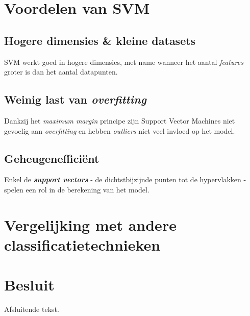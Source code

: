 \documentclass[kulak]{kulakposter}
\begin{document}
\begin{multicols}{2}
\section{Voordelen van SVM}

\subsection{Hogere dimensies \& kleine datasets}

SVM werkt goed in hogere dimensies, met name wanneer het aantal \textit{features} groter is dan het aantal datapunten.

\subsection{Weinig last van \textit{overfitting}}

Dankzij het \textit{maximum margin} principe zijn Support Vector Machines niet gevoelig aan \textit{overfitting} en hebben \textit{outliers} niet veel invloed op het model.

\subsection{Geheugenefficiënt}

Enkel de \textbf{\textit{support vectors}} - de dichtstbijzijnde punten tot de hypervlakken - spelen een rol in de berekening van het model.
	
	\columnbreak
	\section{Vergelijking met andere classificatietechnieken}
\end{multicols}


\section*{Besluit}
\begin{multicols}{2}\setlength{\columnseprule}{0pt}
Afsluitende tekst.
\end{multicols}

\nocite{mediumarticle}



\end{document}
